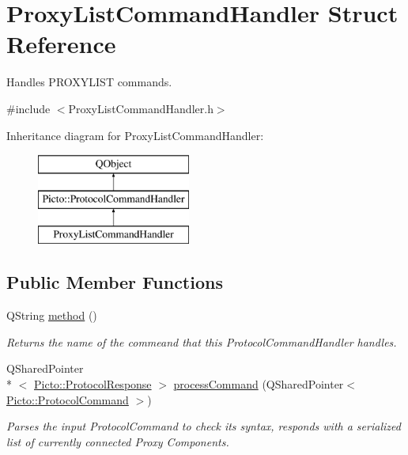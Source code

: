 \hypertarget{struct_proxy_list_command_handler}{\section{Proxy\-List\-Command\-Handler Struct Reference}
\label{struct_proxy_list_command_handler}
}


Handles P\-R\-O\-X\-Y\-L\-I\-S\-T commands.  




{\ttfamily \#include $<$Proxy\-List\-Command\-Handler.\-h$>$}

Inheritance diagram for Proxy\-List\-Command\-Handler\-:\begin{figure}[H]
\begin{center}
\leavevmode
\includegraphics[height=3.000000cm]{struct_proxy_list_command_handler}
\end{center}
\end{figure}
\subsection*{Public Member Functions}
\begin{DoxyCompactItemize}
\item 
\hypertarget{struct_proxy_list_command_handler_a38b268ee34bc3518e59f443a103c5fb1}{Q\-String \hyperlink{struct_proxy_list_command_handler_a38b268ee34bc3518e59f443a103c5fb1}{method} ()}\label{struct_proxy_list_command_handler_a38b268ee34bc3518e59f443a103c5fb1}

\begin{DoxyCompactList}\small\item\em Returns the name of the commeand that this Protocol\-Command\-Handler handles. \end{DoxyCompactList}\item 
Q\-Shared\-Pointer\\*
$<$ \hyperlink{struct_picto_1_1_protocol_response}{Picto\-::\-Protocol\-Response} $>$ \hyperlink{struct_proxy_list_command_handler_a8bf176bad0742773ad73611ba64fa6f4}{process\-Command} (Q\-Shared\-Pointer$<$ \hyperlink{struct_picto_1_1_protocol_command}{Picto\-::\-Protocol\-Command} $>$)
\begin{DoxyCompactList}\small\item\em Parses the input Protocol\-Command to check its syntax, responds with a serialized list of currently connected Proxy Components. \end{DoxyCompactList}\end{DoxyCompactItemize}


